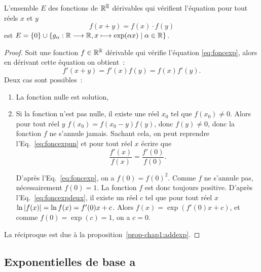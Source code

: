 \begin{theo}
  L'ensemble \(E\) des fonctions de \(\mathbb{R}^{\mathbb{R}}\) dérivables qui vérifient 
  l'équation pour tout réels \(x\) et \(y\)
  \begin{equation}\label{eq:foncexp}
    f(x+y) = f(x) \cdot f(y)
  \end{equation}
  est \(E = \left\{0\right\} \cup 
  \left\{g_{\alpha}:\mathbb{R} \longrightarrow \mathbb{R}, x \longmapsto \exp(\alpha x)\mathrel{}\middle|\mathrel{}\alpha \in \mathbb{R}\right\}\).
\end{theo}

\begin{proof}
  Soit une fonction \(f \in \mathbb{R}^{\mathbb{R}}\) dérivable qui vérifie l'équation 
  \eqref{eq:foncexp}, alors en dérivant cette équation on obtient~:
  \begin{equation}\label{eq:foncexpun}
    f'(x+y) = f'(x)f(y) = f(x)f'(y).
  \end{equation}
  Deux cas sont possibles~:
  \begin{enumerate}
    \item La fonction nulle est solution,
    \item Si la fonction n'est pas nulle, il existe une réel \(x_0\) tel que 
      \(f(x_0) \neq 0\). Alors pour tout réel \(y\) \(f(x_0)= f(x_0-y)f(y)\), 
      donc \(f(y) \neq 0\), donc la fonction \(f\) ne s'annule jamais. Sachant 
      cela, on peut reprendre l'Eq.~\eqref{eq:foncexpun} et pour tout réel \(x\) 
      écrire que           \begin{equation}\label{eq:foncexpdeux}
        \frac{f'(x)}{f(x)} = \frac{f'(0)}{f(0)}.
      \end{equation}

      D'après l'Eq.~\eqref{eq:foncexp}, on a \(f(0) = f(0)^2\).
      Comme \(f\) ne s'annule pas, nécessairement \(f(0) = 1\). La fonction 
      \(f\) est donc toujours positive. D'après l'Eq.~\eqref{eq:foncexpdeux}, il 
      existe un réel \(c\) tel que pour tout réel \(x\) \(\ln \left\lvert f(x)\right\rvert = \ln 
      f(x) = f'(0) x + c\). Alors \(f(x) = \exp(f'(0) x +c)\), et comme \(f(0) = 
      \exp(c) = 1\), on a \(c = 0\).
  \end{enumerate}

  La réciproque est due à la proposition~\ref{prop-chap1:addexp}.
\end{proof}

\subsection{Exponentielles de base a}\label{subsec:chap1-expa}

